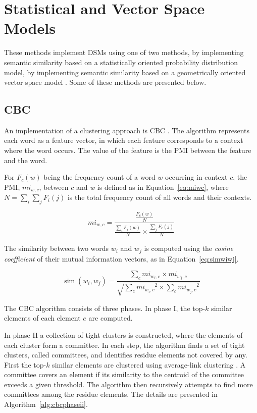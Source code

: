 \section{Statistical and Vector Space Models}
\label{sec:vectorspace}

These methods implement \acp{DSM} using one of two methods, by implementing
semantic similarity based on a statistically oriented probability distribution
model, by implementing semantic similarity based on a geometrically oriented
vector space model \cite{van2010mining}. Some of these methods are presented
below.

\subsection{CBC}

An implementation of a clustering approach is \ac{CBC}
\cite{pantel2003clustering,pantel2002discovering}. The algorithm represents each
word as a feature vector, in which each feature corresponds to a context where
the word occurs. The value of the feature is the \ac{PMI} between the feature
and the word.

For $F_c(w)$ being the frequency count of a word $w$ occurring in context $c$,
the \ac{PMI}, $mi_{w,c}$, between $c$ and $w$ is defined as in
Equation~\ref{eq:miwc}, where $N = \sum_i\sum_jF_i(j)$ is the total frequency
count of all words and their contexts.

\begin{equation}
 mi_{w,c} = \frac{\frac{F_c(w)}{N}}
                 {\frac{\sum_iF_i(w)}{N} \times
                  \frac{\sum_jF_c(j)}{N}}
 \label{eq:miwc}
\end{equation}

The similarity between two words $w_i$ and $w_j$ is computed using the
\textit{cosine coefficient} of their mutual information vectors, as in
Equation~\ref{eq:simwiwj}.

\begin{equation}
 \operatorname{sim}(w_i,w_j) = \frac{\sum_c mi_{w_i,c} \times mi_{w_j,c}}
                     {\sqrt{\sum_c{mi_{w_i,c}}^2 \times \sum_c{mi_{w_j,c}}^2}}
 \label{eq:simwiwj}
\end{equation}

The \ac{CBC} algorithm consists of three phases. In phase I, the top-$k$
similar elements of each element $e$ are computed.

In phase II a collection of tight clusters is constructed, where the
elements of each cluster form a committee. In each step, the algorithm finds a
set of tight clusters, called committees, and identifies residue elements not
covered by any. First the top-$k$ similar elements are clustered using
average-link clustering \cite{han2000data}. A committee covers an element if
its similarity to the centroid of the committee exceeds a given threshold. The
algorithm then recursively attempts to find more committees among the residue
elements. The details are presented in Algorithm~\ref{alg:cbcphaseii}.

